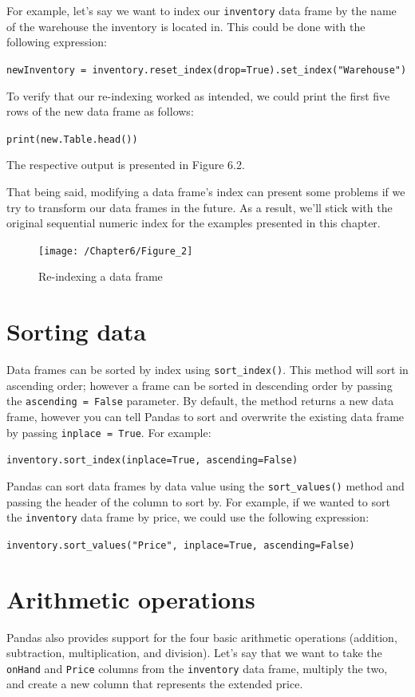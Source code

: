 \documentclass{book}
\begin{document}
For example, let's say we want to index our \texttt{inventory} data frame by the name of the warehouse the inventory is located in. This could be done with the following expression:

\texttt{newInventory = inventory.reset\_index(drop=True).set\_index("Warehouse")}

To verify that our re-indexing worked as intended, we could print the first five rows of the new data frame as follows:

\texttt{print(new.Table.head())}

The respective output is presented in Figure 6.2.

That being said, modifying a data frame's index can present some problems if we try to transform our data frames in the future. As a result, we'll stick with the original sequential numeric index for the examples presented in this chapter.

\begin{figure}[h]
	\caption{Re-indexing a data frame}
	\centering\texttt{[image: /Chapter6/Figure\_2]}
\end{figure}

\section{Sorting data}

Data frames can be sorted by index using \texttt{sort\_index()}. This method will sort in ascending order; however a frame can be sorted in descending order by passing the \texttt{ascending = False} parameter. By default, the method returns a new data frame, however you can tell Pandas to sort and overwrite the existing data frame by passing \texttt{inplace = True}. For example:

\texttt{inventory.sort\_index(inplace=True, ascending=False)}

Pandas can sort data frames by data value using the \texttt{sort\_values()} method and passing the header of the column to sort by. For example, if we wanted to sort the \texttt{inventory} data frame by price, we could use the following expression:

\texttt{inventory.sort\_values("Price", inplace=True, ascending=False)}

\section{Arithmetic operations}

Pandas also provides support for the four basic arithmetic operations (addition, subtraction, multiplication, and division). Let's say that we want to take the \texttt{onHand} and \texttt{Price} columns from the \texttt{inventory} data frame, multiply the two, and create a new column that represents the extended price. 
\end{document}
